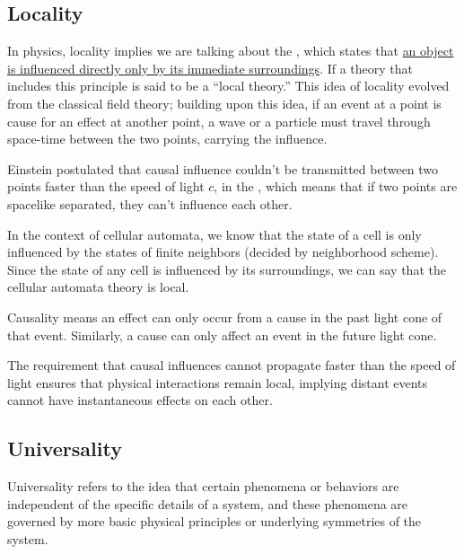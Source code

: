 \documentclass[11pt, oneside, listof=totoc]{scrbook}
\begin{document}
\subsection{Locality} \label{ssec: locality}

In physics, locality implies we are talking about the , which states that \uline{an object is influenced directly only by its immediate surroundings}. If a theory that includes this principle is said to be a ``local theory.'' This idea of locality evolved from the classical field theory; building upon this idea, if an event at a point is cause for an effect at another point, a wave or a particle must travel through space-time between the two points, carrying the influence.

Einstein postulated that causal influence couldn't be transmitted between two points faster than the speed of light \(c\), in the , which means that if two points are spacelike separated, they can't influence each other. %

In the context of cellular automata, we know that the state of a cell is only influenced by the states of finite neighbors (decided by neighborhood scheme). Since the state of any cell is influenced by its surroundings, we can say that the cellular automata theory is local.

\begin{remark}
    Causality means an effect can only occur from a cause in the past light cone of that event. Similarly, a cause can only affect an event in the future light cone.

    The requirement that causal influences cannot propagate faster than the speed of light ensures that physical interactions remain local, implying distant events cannot have instantaneous effects on each other.
\end{remark}

\subsection{Universality} \label{ssec: universality}
Universality refers to the idea that certain phenomena or behaviors are independent of the specific details of a system, and these phenomena are governed by more basic physical principles or underlying symmetries of the system.
\end{document}
